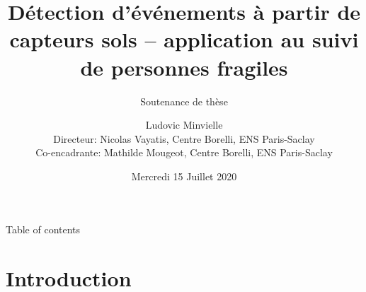 \documentclass[9pt,t,aspectratio=1610]{beamer}
\title{Détection d'événements à partir de capteurs sols -- application au suivi de personnes fragiles}
\subtitle{Soutenance de thèse}
\author{Ludovic Minvielle\\[0.4cm]
    Directeur: Nicolas Vayatis, Centre Borelli, ENS Paris-Saclay\\
    Co-encadrante: Mathilde Mougeot, Centre Borelli, ENS Paris-Saclay}
\institute[VFU] %
{
        Thèse industrielle entre l'ENS Paris-Saclay et Tarkett
}
\date{Mercredi 15 Juillet 2020}
\begin{document}
\graphicspath{{./images/}}
\begingroup
\makeatletter
\makeatother
{}  %
\endgroup
% 

\begingroup
{}  %
\begin{frame}{Table of contents}
\hfill
\parbox[t]{.85\textwidth}{
  \begin{minipage}[c][0.65\textheight]{\textwidth}
  \tableofcontents
  \end{minipage}
}
\end{frame}
\endgroup

\section{Introduction}
\subsection{}

\end{document}
